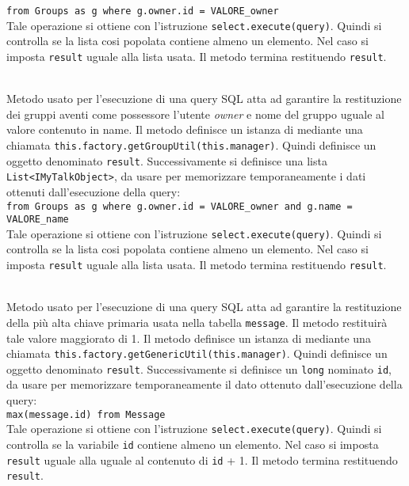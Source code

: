 \begin{description}
	\verb|from Groups as g where g.owner.id = VALORE_owner|\\
	
	Tale operazione si ottiene con l'istruzione \verb|select.execute(query)|. Quindi si controlla se la lista cosi popolata contiene almeno un elemento. Nel caso si imposta \texttt{result} uguale alla lista usata. Il metodo termina restituendo \texttt{result}.
	
			\item{}\\
	Metodo usato per l'esecuzione di una query SQL atta ad garantire la restituzione dei gruppi aventi come possessore l'utente \textit{owner} e nome del gruppo uguale al valore contenuto in name. Il metodo definisce un istanza di  mediante una chiamata \verb|this.factory.getGroupUtil(this.manager)|. Quindi definisce un oggetto  denominato \texttt{result}. Successivamente si definisce una lista \texttt{List<IMyTalkObject>}, da usare per memorizzare temporaneamente i dati ottenuti dall'esecuzione della query:\\
	
	\verb|from Groups as g where g.owner.id = VALORE_owner and g.name = VALORE_name |\\
	
	Tale operazione si ottiene con l'istruzione \verb|select.execute(query)|. Quindi si controlla se la lista cosi popolata contiene almeno un elemento. Nel caso si imposta \texttt{result} uguale alla lista usata. Il metodo termina restituendo \texttt{result}.
	
	\item{}\\
	Metodo usato per l'esecuzione di una query SQL atta ad garantire la restituzione della più alta chiave primaria usata nella tabella \texttt{message}. Il metodo restituirà tale valore maggiorato di 1. Il metodo definisce un istanza di  mediante una chiamata \verb|this.factory.getGenericUtil(this.manager)|. Quindi definisce un oggetto  denominato \texttt{result}. Successivamente si definisce un \texttt{long} nominato \texttt{id}, da usare per memorizzare temporaneamente il dato ottenuto dall'esecuzione della query:\\
	
	\verb|max(message.id) from Message|\\
	
	Tale operazione si ottiene con l'istruzione \verb|select.execute(query)|. Quindi si controlla se la variabile \texttt{id} contiene almeno un elemento. Nel caso si imposta \texttt{result} uguale alla uguale al contenuto di \texttt{id} + 1. Il metodo termina restituendo \texttt{result}.
	

\end{description}
